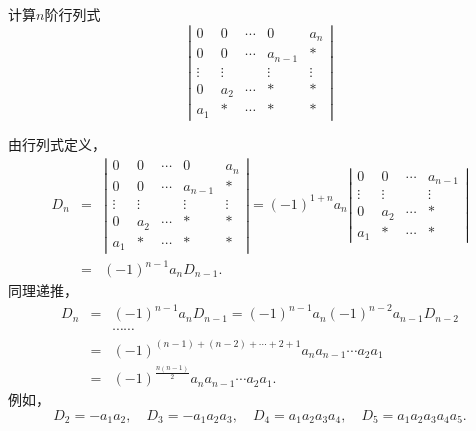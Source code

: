 \begin{li}
  计算$n$阶行列式
  $$
  \left|
    \begin{array}{ccccc}
      0  &  0 & \cdots & 0 & a_n \\
      0  &  0 & \cdots & a_{n-1} & * \\
      \vdots & \vdots & & \vdots & \vdots\\  
      0  &  a_2 & \cdots & * & * \\
      a_1 & * & \cdots & * & *
    \end{array}
  \right| 
  $$
\end{li}
\begin{jie}
  由行列式定义，
  $$
  \begin{array}{rcl}
    D_n &=& \left|
            \begin{array}{ccccc}
              0  &  0 & \cdots & 0 & a_n \\
              0  &  0 & \cdots & a_{n-1} & * \\
              \vdots & \vdots & & \vdots & \vdots\\  
              0  &  a_2 & \cdots & * & * \\
              a_1 & * & \cdots & * & *
            \end{array}
                                     \right| =   (-1)^{1+n} a_n \left|
                                     \begin{array}{cccc}
                                       0  &  0 & \cdots &   a_{n-1} \\
                                       \vdots & \vdots &  & \vdots\\  
                                       0  &  a_2 & \cdots  & * \\
                                       a_1 & * & \cdots  & *
                                     \end{array} 
                                                           \right| \\
        &=&  (-1)^{n-1} a_n D_{n-1}.      
  \end{array}
  $$
  同理递推，
  $$
  \begin{array}{rcl}
    D_n & =& (-1)^{n-1} a_n D_{n-1}  = (-1)^{n-1} a_n (-1)^{n-2} a_{n-1} D_{n-2} \\[0.1in]
        && \cdots\cdots \\[0.2cm]
        &=&   (-1)^{(n-1)+(n-2)+\cdots+2+1} a_n a_{n-1} \cdots a_2 a_1 \\[0.1in]
        &=&  (-1)^{\frac{n(n-1)}{2}} a_n a_{n-1} \cdots a_2 a_1.
  \end{array}
  $$
  例如，
  $$
  D_2 = -a_1a_2, \quad
  D_3 = -a_1a_2a_3, \quad
  D_4 = a_1a_2a_3a_4, \quad
  D_5 = a_1a_2a_3a_4a_5.
  $$
\end{jie}
